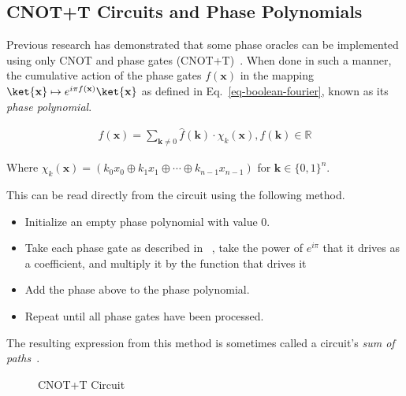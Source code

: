\subsection{CNOT+T Circuits and Phase Polynomials}
\label{Pre:CnotPhase}

Previous research has demonstrated that some phase oracles can be implemented using only
CNOT and phase gates (CNOT+T)~\cite{bib-amy-cnot}. When done in such a manner,
the cumulative action of the phase gates $f(\mathbf{x})$ in the mapping
$\ket{\mathbf{x}} \mapsto e^{i \pi f(\mathbf{x})}\ket{\mathbf{x}}$
as defined in Eq.~\ref{eq-boolean-fourier}, known as its {\it phase polynomial}.

\begin{equation}
  \begin{aligned}
    \label{eq-boolean-fourier}
    f(\mathbf{x}) = \sum_{\mathbf{k} \neq 0} \hat{f}(\mathbf{k}) \cdot \chi_k(\mathbf{x}),
    \hat{f}(\mathbf{k}) \in \mathbb{R}
  \end{aligned}
\end{equation}

Where $\chi_k(\mathbf{x}) = ( k_0 x_0 \oplus k_1 x_1 \oplus \cdots \oplus k_{n-1} x_{n-1})$
for $\mathbf{k} \in \{0,1\}^{n}$. 

This can be read directly from the circuit using the following method.

\begin{itemize}
\item Initialize an empty phase polynomial with value 0.
\item Take each phase gate as described in ~, take the power
  of $e^{i\pi}$ that it drives as a coefficient, and multiply it by the function
  that drives it
\item Add the phase above to the phase polynomial.
\item Repeat until all phase gates have been processed.
\end{itemize}

The resulting expression from this method is sometimes called a circuit's
\emph{sum of paths}~\cite{bib-amy-cnot}.

\begin{figure}[t]
  \centering
  \scalebox{0.7} {
    
  }
  \caption{CNOT+T Circuit}
  \label{fig-toff-mark-matroid2}
\end{figure}

